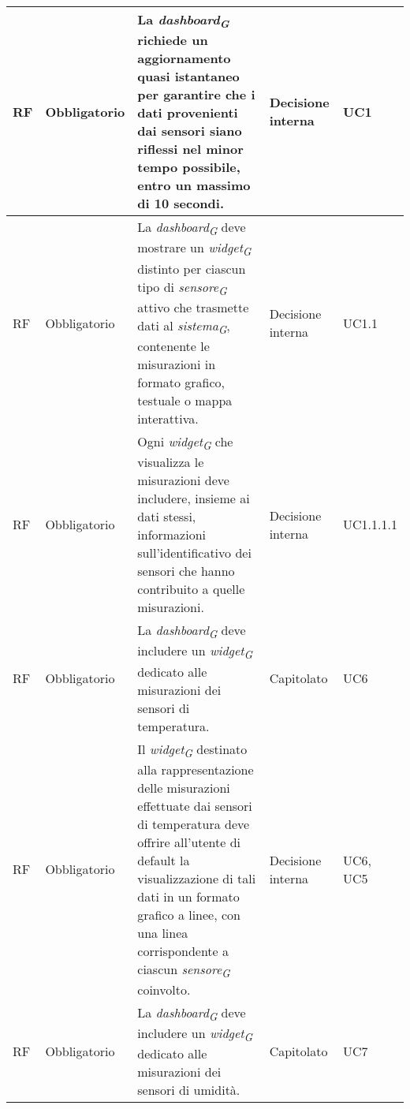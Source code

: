 \begin{longtable}{|C{1.5cm}|C{2cm}|L{5cm}|C{2cm}|C{1.5cm}|}
    \hline
     RF & Obbligatorio & La \textit{dashboard}\textsubscript{\textit{G}} richiede un aggiornamento quasi istantaneo per garantire che i dati provenienti dai sensori siano riflessi nel minor tempo possibile, entro un massimo di 10 secondi.& Decisione interna & UC1 \\
    
    \hline
     RF & Obbligatorio & La \textit{dashboard}\textsubscript{\textit{G}} deve mostrare un \textit{widget}\textsubscript{\textit{G}} distinto per ciascun tipo di \textit{sensore}\textsubscript{\textit{G}} attivo che trasmette dati al \textit{sistema}\textsubscript{\textit{G}}, contenente le misurazioni in formato grafico, testuale o mappa interattiva.& Decisione interna & UC1.1 \\
    
    \hline
     RF & Obbligatorio & Ogni \textit{widget}\textsubscript{\textit{G}} che visualizza le misurazioni deve includere, insieme ai dati stessi, informazioni sull'identificativo dei sensori che hanno contribuito a quelle misurazioni.& Decisione interna & UC1.1.1.1 \\
    
    \hline
     RF & Obbligatorio & La \textit{dashboard}\textsubscript{\textit{G}} deve includere un \textit{widget}\textsubscript{\textit{G}} dedicato alle misurazioni dei sensori di temperatura.& Capitolato & UC6 \\
    
    \hline
     RF & Obbligatorio &Il \textit{widget}\textsubscript{\textit{G}} destinato alla rappresentazione delle misurazioni effettuate dai sensori di temperatura deve offrire all'utente di default la visualizzazione di tali dati in un formato grafico a linee, con una linea corrispondente a ciascun \textit{sensore}\textsubscript{\textit{G}} coinvolto.& Decisione interna & UC6, UC5\\
    
    \hline
     RF & Obbligatorio & La \textit{dashboard}\textsubscript{\textit{G}} deve includere un \textit{widget}\textsubscript{\textit{G}} dedicato alle misurazioni dei sensori di umidità.& Capitolato & UC7 \\
    

\end{longtable}
